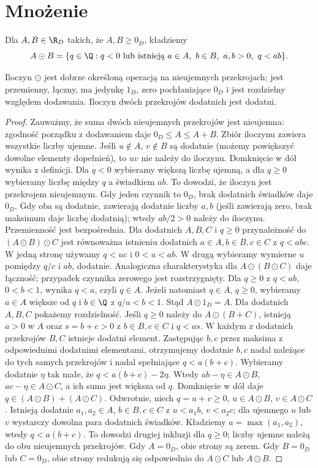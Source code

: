 \section{Mnożenie}
\label{ma1:sec:cut-product}
\begin{definicja}
Dla $A,B\in\R_D$ takich, że $A,B\ge0_D$, kładziemy
\[
 A\odot B=\{q\in\Q:q<0\ \text{lub istnieją }a\in A,\ b\in B,\ a,b>0,\ q<ab\}.
\]
\end{definicja}
\begin{lemat}
\label{ma1:lem:positive-products}
Iloczyn $\odot$ jest dobrze określoną operacją na nieujemnych przekrojach; jest przemienny, łączny, ma jedynkę $1_D$, zero pochłaniające $0_D$ i jest rozdzielny względem dodawania. Iloczyn dwóch przekrojów dodatnich jest dodatni.
\end{lemat}
\begin{proof}
Zauważmy, że suma dwóch nieujemnych przekrojów jest nieujemna: zgodność porządku z dodawaniem daje $0_D\le A\le A+B$. Zbiór iloczynu zawiera wszystkie liczby ujemne. Jeśli $u\notin A$, $v\notin B$ są dodatnie (możemy powiększyć dowolne elementy dopełnień), to $uv$ nie należy do iloczynu. Domknięcie w dół wynika z definicji. Dla $q<0$ wybieramy większą liczbę ujemną, a dla $q\ge0$ wybieramy liczbę między $q$ a świadkiem $ab$. To dowodzi, że iloczyn jest przekrojem nieujemnym. Gdy jeden czynnik to $0_D$, brak dodatnich świadków daje $0_D$. Gdy oba są dodatnie, zawierają dodatnie liczby $a,b$ (jeśli zawierają zero, brak maksimum daje liczbę dodatnią); wtedy $ab/2>0$ należy do iloczynu.
Przemienność jest bezpośrednia. Dla dodatnich $A,B,C$ i $q\ge0$ przynależność do $(A\odot B)\odot C$ jest równoważna istnieniu dodatnich $a\in A,b\in B,c\in C$ z $q<abc$. W jedną stronę używamy $q<uc$ i $0<u<ab$. W drugą wybieramy wymierne $u$ pomiędzy $q/c$ i $ab$, dodatnie. Analogiczna charakterystyka dla $A\odot(B\odot C)$ daje łączność; przypadek czynnika zerowego jest rozstrzygnięty. Dla $q\ge0$ z $q<ab$, $0<b<1$, wynika $q<a$, czyli $q\in A$. Jeżeli natomiast $q\in A$, $q\ge0$, wybieramy $a\in A$ większe od $q$ i $b\in\Q$ z $q/a<b<1$. Stąd $A\odot1_D=A$.
Dla dodatnich $A,B,C$ pokażemy rozdzielność. Jeśli $q\ge0$ należy do $A\odot(B+C)$, istnieją $a>0$ w $A$ oraz $s=b+c>0$ z $b\in B,c\in C$ i $q<as$. W każdym z dodatnich przekrojów $B,C$ istnieje dodatni element. Zastępując $b,c$ przez maksima z odpowiednimi dodatnimi elementami, otrzymujemy dodatnie $b,c$ nadal należące do tych samych przekrojów i nadal spełniające $q<a(b+c)$. Wybieramy dodatnie $\eta$ tak małe, że $q<a(b+c)-2\eta$. Wtedy $ab-\eta\in A\odot B$, $ac-\eta\in A\odot C$, a ich suma jest większa od $q$. Domknięcie w dół daje $q\in (A\odot B)+(A\odot C)$.
Odwrotnie, niech $q=u+v\ge0$, $u\in A\odot B$, $v\in A\odot C$. Istnieją dodatnie $a_1,a_2\in A$, $b\in B,c\in C$ z $u<a_1b$, $v<a_2c$; dla ujemnego $u$ lub $v$ wystarczy dowolna para dodatnich świadków. Kładziemy $a=\max(a_1,a_2)$, wtedy $q<a(b+c)$. To dowodzi drugiej inkluzji dla $q\ge0$; liczby ujemne należą do obu nieujemnych przekrojów. Gdy $A=0_D$, obie strony są zerem. Gdy $B=0_D$ lub $C=0_D$, obie strony redukują się odpowiednio do $A\odot C$ lub $A\odot B$.
\end{proof}
